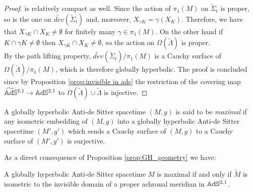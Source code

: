 \begin{proof}
    is relatively compact as well. Since the action of $\pi_1(M)$ on $\widetilde{\Sigma}_t$ is proper, so is the one on $\widetilde{dev}(\widetilde{\Sigma}_t)$ and, moreover, $X_{\gamma K} = \gamma(X_K)$. Therefore, we have that $X_{\gamma K} \cap X_K \neq \emptyset$ for finitely many $\gamma \in \pi_1(M)$. On the other hand if $K \cap \gamma K \neq \emptyset$ then $X_{\gamma K} \cap X_K \neq \emptyset$, so the action on $\Omega(\widetilde{\Lambda})$ is proper.\\
    By the path lifting property, $\widetilde{dev}(\widetilde{\Sigma}_t) / \pi_1(M)$ is a Cauchy surface of $\Omega(\widetilde{\Lambda}) / \pi_1(M)$, which is therefore globally hyperbolic. The proof is concluded since by Proposition \ref{prop:invisible in ads} the restriction of the covering map $\widetilde{\mathbb{A}\mathrm{d}\mathbb{S}}{}^{2,1} \to \mathbb{A}\mathrm{d}\mathbb{S}^{2,1}$ to $\Omega(\widetilde{\Lambda}) \cup \widetilde{\Lambda}$ is injective.
\end{proof}
\begin{definition}
    A globally hyperbolic Anti-de Sitter spacetime $(M,g)$ is said to be \textit{maximal} if any isometric embedding of $(M,g)$ into a globally hyperbolic Anti-de Sitter spacetime $(M',g')$ which sends a Cauchy surface of $(M,g)$ to a Cauchy surface of $(M',g')$ is surjective.
\end{definition}
As a direct consequence of Proposition \ref{prop:GH_geometry} we have:
\begin{corollary} \label{cor:MGH}
    A globally hyperbolic Anti-de Sitter spacetime $M$ is maximal if and only if $\widetilde{M}$ is isometric to the invisible domain of a proper achronal meridian in $\mathbb{A}\mathrm{d}\mathbb{S}^{2,1}$.
\end{corollary}

